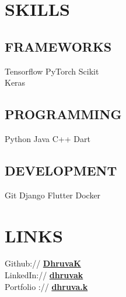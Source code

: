 \documentclass[]{deedy-resume-openfont}
\begin{document}
\begin{minipage}[t]{0.33\textwidth}
\sectionsep

\section{SKILLS}
\subsection{FRAMEWORKS}
\large{Tensorflow \textbullet{} PyTorch \textbullet{} Scikit  \\
\textbullet{} Keras}
\subsection{PROGRAMMING}
\large{Python \textbullet{} Java \textbullet{} C++ \textbullet{} Dart}
\subsection{DEVELOPMENT}
Git \textbullet{} Django \textbullet{} Flutter \textbullet{} Docker


\sectionsep

\section{LINKS}
\large{Github:// \href{https://github.com/dhruvak99}{\bf DhruvaK} \\
LinkedIn://  \href{https://www.linkedin.com/in/dhruva-k-72600318a/}{\bf dhruvak} \\
Portfolio :// \href{https://dhruva.dev.io}{\bf dhruva.k}}
\sectionsep

%
%

\end{minipage} 
\hfill
\end{document}
